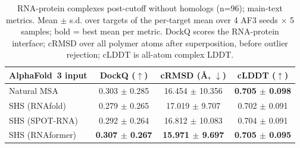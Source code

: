 \begin{table}[htbp]
\centering
\caption{RNA-protein multichain complexes (n=265). Mean $\pm$ s.d. over targets of the per-target mean over 4 AF3 seeds $\times$ 5 samples; bold = best mean per metric. DockQ, ICS and QS-global score the RNA-protein interface; cTM is the complex TM-score; cRMSD over all polymer atoms after superposition, before outlier rejection; cLDDT is all-atom complex LDDT.}
\label{tab:rna_protein_multichain_complexes}
\end{table}

\begin{table}[htbp]
\centering
\caption{RNA-protein complexes post-cutoff without homologs (n=96); main-text metrics. Mean $\pm$ s.d. over targets of the per-target mean over 4 AF3 seeds $\times$ 5 samples; bold = best mean per metric. DockQ scores the RNA-protein interface; cRMSD over all polymer atoms after superposition, before outlier rejection; cLDDT is all-atom complex LDDT.}
\label{tab:rna_protein_complexes_post_cutoff_without_homologs_reduced}
\begin{tabular}{lccc}
\toprule
AlphaFold~3 input & DockQ ($\uparrow$) & cRMSD (\AA, $\downarrow$) & cLDDT ($\uparrow$) \\
\midrule
Natural MSA & 0.303 $\pm$ 0.285 & 16.454 $\pm$ 10.356 & \textbf{0.705 $\pm$ 0.098} \\
SHS (RNAfold) & 0.279 $\pm$ 0.265 & 17.019 $\pm$ 9.707 & 0.702 $\pm$ 0.091 \\
SHS (SPOT-RNA) & 0.292 $\pm$ 0.264 & 16.812 $\pm$ 10.083 & 0.704 $\pm$ 0.091 \\
SHS (RNAformer) & \textbf{0.307 $\pm$ 0.267} & \textbf{15.971 $\pm$ 9.697} & \textbf{0.705 $\pm$ 0.095} \\
\bottomrule
\end{tabular}
\end{table}

